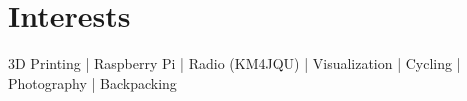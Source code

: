 \documentclass[letterpaper]{deedy-resume} %
\begin{document}
\begin{minipage}[t]{0.33\textwidth}
\section{Interests}

3D Printing | Raspberry Pi | Radio (KM4JQU) |  Visualization | Cycling | Photography | Backpacking


\sectionspace %


\end{minipage} %
\hfill
%
%
\end{document}

